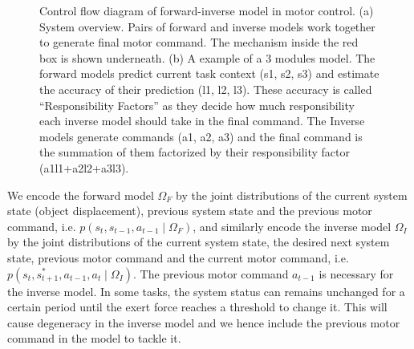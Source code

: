 \begin{figure}
  \centering
      \vspace{0.5cm}
%
  \caption{ \scriptsize{Control flow diagram of forward-inverse model in motor control. (a) System overview. Pairs of forward and inverse models work together to generate final motor command. The mechanism inside the red box is shown underneath. (b) A example of a 3 modules model. The forward models predict current task context (s1, s2, s3) and estimate the accuracy of their prediction (l1, l2, l3). These accuracy is called ``Responsibility Factors'' as they decide how much responsibility each inverse model should take in the final command. The Inverse models generate commands (a1, a2, a3) and the final command is the summation of them factorized by their responsibility factor (a1l1+a2l2+a3l3).  }
}
\label{fig:control}
\end{figure}


We encode the forward model $\Omega_F$ by the joint distributions of the current system state (object displacement), previous system state and the previous motor command, i.e. $p(s_t,s_{t-1},a_{t-1}\mid{\Omega_F})$, and similarly encode the inverse model $\Omega_I$ by the joint distributions of the current system state, the desired next system state, previous motor command and the current motor command, i.e. $p(s_t,s^{*}_{t+1},a_{t-1},a_t{\mid}{\Omega_I})$.
The previous motor command $a_{t-1}$ is necessary for the inverse model. In some tasks, the system status can remains unchanged for a certain period until the exert force reaches a threshold to change it. This will cause degeneracy in the inverse model and we hence include the previous motor command in the model to tackle it.



